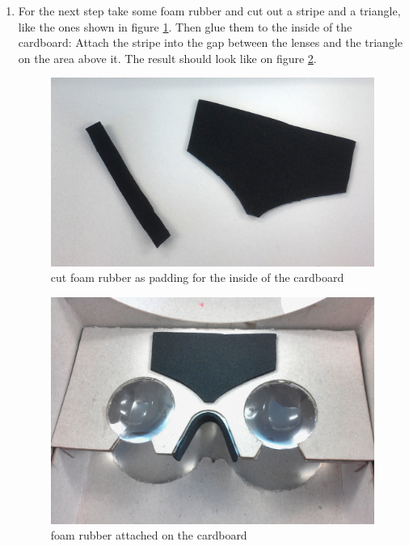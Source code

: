 \documentclass[../../Cardboard_Assembling]{subfiles}
\begin{document}
\begin{enumerate}
	\item For the next step take some foam rubber and cut out a stripe and a triangle, like the ones shown in figure \ref{fig:foamrubber1}. Then glue them to the inside of the cardboard: Attach the stripe into the gap between the lenses and the triangle on the area above it. The result should look like on figure \ref{fig:foamrubber2}.
	\begin{figure}[!htb]
		\centering
		\includegraphics[width=0.75\linewidth]{foamrubber01}
		\caption{cut foam rubber as padding for the inside of the cardboard}
		\label{fig:foamrubber1}
	\end{figure}
	\begin{figure}[!htb]
		\centering
		\includegraphics[width=0.75\linewidth]{foamrubber02}
		\caption{foam rubber attached on the cardboard}
		\label{fig:foamrubber2}
	\end{figure}
	

\end{enumerate}
\end{document}
